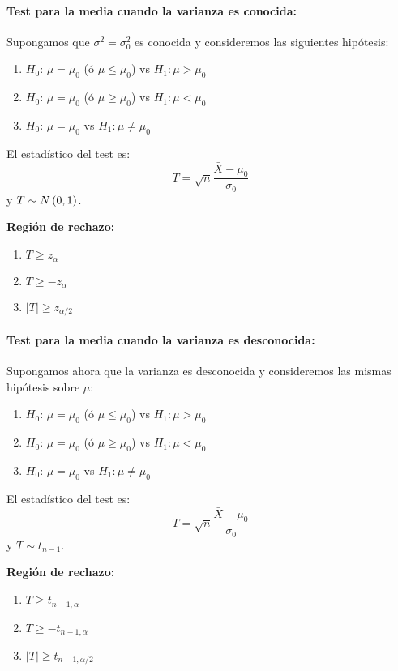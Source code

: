 \paragraph{Test para la media cuando la varianza es conocida:} Supongamos que $\sigma^2 = \sigma_0^2$ es conocida y consideremos las siguientes hipótesis:

\begin{enumerate}
	\item $H_0$: $\mu = \mu_0$ (ó $\mu \leq \mu_0$) vs  $H_1: \mu > \mu_0$
	\item $H_0$: $\mu = \mu_0$ (ó $\mu \geq \mu_0$) vs  $H_1: \mu < \mu_0$
	\item $H_0$: $\mu = \mu_0$ vs  $H_1: \mu \neq \mu_0$
\end{enumerate}

El estadístico del test es: $$T = \sqrt{n}\frac{\bar{X}-\mu_0}{\sigma_0}$$ y $T\sim N\left(0,1\right)$.

\textbf{Región de rechazo:}
\begin{enumerate}
\item $T\geq z_{\alpha}$
\item $T \geq -z_{\alpha}$
\item $|T| \geq z_{\alpha/2}$
\end{enumerate}

\paragraph{Test para la media cuando la varianza es desconocida:} Supongamos ahora que la varianza es desconocida y consideremos las mismas hipótesis sobre $\mu$:

\begin{enumerate}
	\item $H_0$: $\mu = \mu_0$ (ó $\mu \leq \mu_0$) vs  $H_1: \mu > \mu_0$
	\item $H_0$: $\mu = \mu_0$ (ó $\mu \geq \mu_0$) vs  $H_1: \mu < \mu_0$
	\item $H_0$: $\mu = \mu_0$ vs  $H_1: \mu \neq \mu_0$
\end{enumerate}

El estadístico del test es: $$T = \sqrt{n}\frac{\bar{X}-\mu_0}{\sigma_0}$$ y $T\sim t_{n-1}$.

\textbf{Región de rechazo:}
\begin{enumerate}
	\item $T\geq t_{n-1,\alpha}$
	\item $T \geq -t_{n-1,\alpha}$
	\item $|T| \geq t_{n-1,\alpha/2}$
\end{enumerate}

